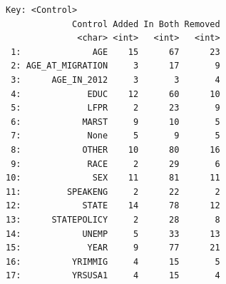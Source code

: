 \documentclass[
  letterpaper,
  DIV=11,
  numbers=noendperiod]{scrartcl}
\begin{document}
\begin{verbatim}
Key: <Control>
             Control Added In Both Removed
              <char> <int>   <int>   <int>
 1:              AGE    15      67      23
 2: AGE_AT_MIGRATION     3      17       9
 3:      AGE_IN_2012     3       3       4
 4:             EDUC    12      60      10
 5:             LFPR     2      23       9
 6:            MARST     9      10       5
 7:             None     5       9       5
 8:            OTHER    10      80      16
 9:             RACE     2      29       6
10:              SEX    11      81      11
11:         SPEAKENG     2      22       2
12:            STATE    14      78      12
13:      STATEPOLICY     2      28       8
14:            UNEMP     5      33      13
15:             YEAR     9      77      21
16:          YRIMMIG     4      15       5
17:          YRSUSA1     4      15       4
\end{verbatim}
\end{document}
